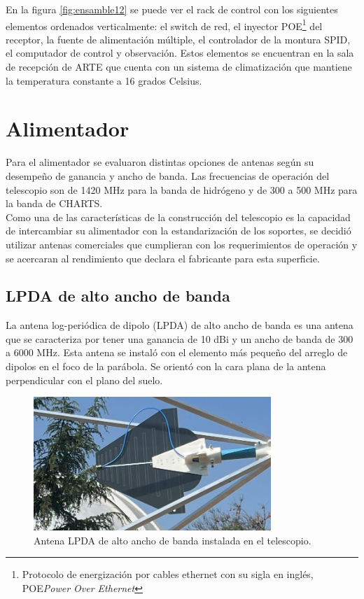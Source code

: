 En la figura \ref{fig:ensamble12} se puede ver el rack de control con los siguientes elementos ordenados verticalmente: el switch de red, el inyector POE\footnote{Protocolo de energización por cables ethernet con su sigla en inglés, POE\textit{Power Over Ethernet}} del receptor, la fuente de alimentación múltiple, el controlador de la montura SPID, el computador de control y observación. Estos elementos se encuentran en la sala de recepción de ARTE que cuenta con un sistema de climatización que mantiene la temperatura constante a 16 grados Celsius.\\

\section{Alimentador}

Para el alimentador se evaluaron distintas opciones de antenas según su desempeño de ganancia y ancho de banda. Las frecuencias de operación del telescopio son de 1420 MHz para la banda de hidrógeno y de 300 a 500 MHz para la banda de CHARTS.\\

Como una de las características de la construcción del telescopio es la capacidad de intercambiar su alimentador con la estandarización de los soportes, se decidió utilizar antenas comerciales que cumplieran con los requerimientos de operación y se acercaran al rendimiento que declara el fabricante para esta superficie.\\

\subsection{LPDA de alto ancho de banda}

La antena log-periódica de dipolo (LPDA) de alto ancho de banda es una antena que se caracteriza por tener una ganancia de 10 dBi y un ancho de banda de 300 a 6000 MHz. Esta antena se instaló con el elemento más pequeño del arreglo de dipolos en el foco de la parábola. Se orientó con la cara plana de la antena perpendicular con el plano del suelo.\\ 

\begin{figure}
    \centering
    \includegraphics[width=0.8\textwidth]{img/lpda}
    \caption{Antena LPDA de alto ancho de banda instalada en el telescopio.}
    \label{fig:ensamble13}
\end{figure}

